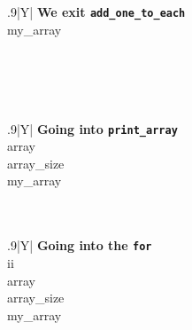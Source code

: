 \documentclass[a4paper]{article}
\begin{document}
\begin{table}[H]
    \begin{subfigure}{0.33333\linewidth}
        \centering
        \begin{tabularx}{.9\linewidth}{|Y|}
        \hline
        \textbf{We exit \texttt{add\_one\_to\_each}} \\\hline
        my\_array\\\hline
        \\ \hline
        \\ \hline
        \\ \hline
        \\ \hline
        \end{tabularx}
    \end{subfigure}%
    \begin{subfigure}{0.33333\linewidth}
        \centering
        \begin{tabularx}{.9\linewidth}{|Y|}
        \hline
        \textbf{Going into \texttt{print\_array}}\\\hline
        array\\\hline
        array\_size\\\hline
        my\_array\\\hline
        \\ \hline
        \\ \hline
        \end{tabularx}
    \end{subfigure}%
    \begin{subfigure}{0.33333\linewidth}
        \centering
        \begin{tabularx}{.9\linewidth}{|Y|}
        \hline
        \textbf{Going into the \texttt{for}}\\\hline
        ii \\\hline
        array\\\hline
        array\_size\\\hline
        my\_array\\\hline
        \\ \hline
        \end{tabularx}
    \end{subfigure}%



\end{table}
\end{document}
